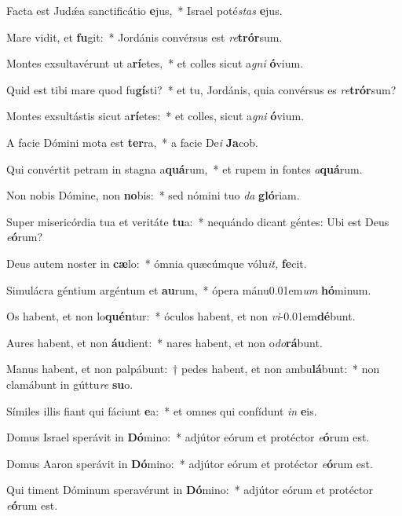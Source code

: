 \item Facta est Judǽa sanctificátio \textbf{e}jus,~* Israel poté\hspace{0.03em}\textit{stas} \textbf{e}jus.
\item Mare vidit, et \textbf{fu}git:~* Jordánis convérsus est \textit{re}\textbf{trór}sum.
\item Montes exsultavérunt ut a\textbf{rí}etes,~* et colles sicut a\textit{gni} \textbf{ó}vium.
\item Quid est tibi mare quod fu\textbf{gí}sti?~* et tu, Jordánis, quia convérsus es \textit{re}\textbf{trór}sum?
\item Montes exsultástis sicut a\textbf{rí}etes:~* et colles, sicut a\textit{gni} \textbf{ó}vium.
\item A facie Dómini mota est \textbf{ter}ra,~* a facie De\hspace{0.03em}\textit{i} \textbf{Ja}cob.
\item Qui convértit petram in stagna a\textbf{quá}rum,~* et rupem in fontes \textit{a}\textbf{quá}rum.
\item Non nobis Dómine, non \textbf{no}bis:~* sed nómini tuo \textit{da} \textbf{gló}riam.
\item Super misericórdia tua et veritáte \textbf{tu}a:~* nequándo dicant géntes: Ubi est Deus \textit{e}\textbf{ó}rum?
\item Deus autem noster in \textbf{cæ}lo:~* ómnia quæcúmque vólu\textit{it,} \textbf{fe}cit.
\item Simulácra géntium argéntum et \textbf{au}rum,~* ópera mánu\kern 0.01em\textit{um} \textbf{hó}minum.
\item Os habent, et non lo\textbf{quén}tur:~* óculos habent, et non \textit{vi}\kern -0.01em\textbf{dé}bunt.
\item Aures habent, et non \textbf{áu}dient:~* nares habent, et non o\textit{do}\textbf{rá}bunt.
\item Manus habent, et non palpábunt:~† pedes habent, et non ambu\textbf{lá}bunt:~* non clamábunt in gúttu\textit{re} \textbf{su}o.
\item Símiles illis fiant qui fáciunt \textbf{e}a:~* et omnes qui confídunt \textit{in} \textbf{e}is.
\item Domus Israel sperávit in \textbf{Dó}mino:~* adjútor eórum et protéctor \textit{e}\textbf{ó}rum est.
\item Domus Aaron sperávit in \textbf{Dó}mino:~* adjútor eórum et protéctor \textit{e}\textbf{ó}rum est.
\item Qui timent Dóminum speravérunt in \textbf{Dó}mino:~* adjútor eórum et protéctor \textit{e}\textbf{ó}rum est.
